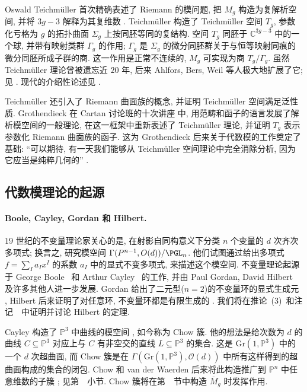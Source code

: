 Oswald Teichmüller 首次精确表述了 Riemann 的模问题, 把 $M_g$ 构造为复解析空间, 并将 $3g-3$ 解释为其复维数 \cite{Tei40,Tei44}. Teichmüller 构造了 Teichmüller 空间 $T_g$, 参数化亏格为 $g$ 的拓扑曲面 $\Sigma_g$ 上按同胚等同的复结构. 空间 $T_g$ 同胚于 $\mathbb C^{3g-3}$ 中的一个球, 并带有映射类群 $\Gamma_g$ 的作用; $\Gamma_g$ 是 $\Sigma_g$ 的微分同胚群关于与恒等映射同痕的微分同胚所成子群的商. 这一作用是正常不连续的, $M_g$ 可实现为商 $T_g/\Gamma_g$. 虽然 Teichmüller 理论曾被遗忘近 $20$ 年, 后来 Ahlfors, Bers, Weil 等人极大地扩展了它; 见 \cite{Wei57,Wei58,AB60,Ber60,Ahl61}. 现代的介绍性论述见 \cite{Ber72,Hub06,FM12}.

Teichmüller 还引入了 Riemann 曲面族的概念, 并证明 Teichmüller 空间满足泛性质. Grothendieck 在 Cartan 讨论班的十次讲座 \cite{Gro61} 中, 用范畴和函子的语言发展了解析模空间的一般理论, 在这一框架中重新表述了 Teichmüller 理论, 并证明 $T_g$ 表示参数化 Riemann 曲面族的函子. 这为 Grothendieck 后来关于代数模的工作奠定了基础: ``可以期待, 有一天我们能够从 Teichmüller 空间理论中完全消除分析, 因为它应当是纯粹几何的'' \cite[讲座 I]{Gro61}.

\subsection{代数模理论的起源}\label{src:1.1.4-subsection}
\paragraph*{Boole, Cayley, Gordan 和 Hilbert.} $19$ 世纪的不变量理论家关心的是, 在射影自同构意义下分类 $n$ 个变量的 $d$ 次齐次多项式; 换言之, 研究模空间 $\Gamma(\mathbb P^{n-1},\mathcal O(d))/\PGL_n$. 他们试图通过给出多项式 $f=\sum_Ia_Ix^I$ 的系数 $a_I$ 中的显式不变多项式, 来描述这个模空间. 不变量理论起源于 George Boole~\cite{Boo41} 和 Arthur Cayley~\cite{Cay45} 的工作, 并由 Paul Gordan, David Hilbert 及许多其他人进一步发展. Gordan 给出了二元型($n=2$)的不变量环的显式生成元 \cite{Gor68}, Hilbert 后来证明了对任意环, 不变量环都是有限生成的 \cite{Hil90,Hil93}. 我们将在推论~(3)~和注记~~中证明并讨论 Hilbert 的定理.

Cayley 构造了 $\mathbb P^3$ 中曲线的模空间 \cite{Cay60,Cay62}, 如今称为 Chow 簇. 他的想法是给次数为 $d$ 的曲线 $C\subseteq\mathbb P^3$ 对应上与 $C$ 有非空交的直线 $L\subseteq\mathbb P^3$ 的集合. 这是 $\mathrm{Gr}(1,\mathbb P^3)$ 中的一个 $d$ 次超曲面, 而 Chow 簇是在 $\Gamma(\mathrm{Gr}(1,\mathbb P^3),\mathcal O(d))$ 中所有这样得到的超曲面构成的集合的闭包. Chow 和 van der Waerden 后来将此构造推广到 $\mathbb P^n$ 中任意维数的子簇 \cite{CW37}; 见第~~小节. Chow 簇将在第~~节中构造 $\overline M_g$ 时发挥作用.

